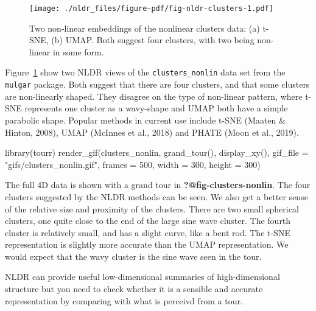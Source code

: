 \documentclass[
  letterpaper,
]{book}
\newenvironment{Shaded}{\begin{snugshade}}{\end{snugshade}}
\newcommand{\AttributeTok}[1]{\textcolor[rgb]{0.40,0.45,0.13}{#1}}
\newcommand{\DecValTok}[1]{\textcolor[rgb]{0.68,0.00,0.00}{#1}}
\newcommand{\FunctionTok}[1]{\textcolor[rgb]{0.28,0.35,0.67}{#1}}
\newcommand{\NormalTok}[1]{\textcolor[rgb]{0.00,0.23,0.31}{#1}}
\newcommand{\StringTok}[1]{\textcolor[rgb]{0.13,0.47,0.30}{#1}}
\begin{document}
\begin{figure}[H]

{\centering \texttt{[image: ./nldr\_files/figure-pdf/fig-nldr-clusters-1.pdf]}

}

\caption{\label{fig-nldr-clusters}Two non-linear embeddings of the
nonlinear clusters data: (a) t-SNE, (b) UMAP. Both suggest four
clusters, with two being non-linear in some form.}

\end{figure}

Figure~\ref{fig-nldr-clusters} show two NLDR views of the
\texttt{clusters\_nonlin} data set from the \texttt{mulgar} package.
Both suggest that there are four clusters, and that some clusters are
non-linearly shaped. They disagree on the type of non-linear pattern,
where t-SNE represents one cluster as a wavy-shape and UMAP both have a
simple parabolic shape. Popular methods in current use include t-SNE
(Maaten \& Hinton, 2008), UMAP (McInnes et al., 2018) and PHATE (Moon et
al., 2019).

\begin{Shaded}
\begin{Highlighting}[]
\FunctionTok{library}\NormalTok{(tourr)}
\FunctionTok{render\_gif}\NormalTok{(clusters\_nonlin, }
           \FunctionTok{grand\_tour}\NormalTok{(),}
           \FunctionTok{display\_xy}\NormalTok{(),}
           \AttributeTok{gif\_file =} \StringTok{"gifs/clusters\_nonlin.gif"}\NormalTok{,}
           \AttributeTok{frames =} \DecValTok{500}\NormalTok{,}
           \AttributeTok{width =} \DecValTok{300}\NormalTok{, }
           \AttributeTok{height =} \DecValTok{300}\NormalTok{)}
\end{Highlighting}
\end{Shaded}

The full 4D data is shown with a grand tour in
\textbf{?@fig-clusters-nonlin}. The four clusters suggested by the NLDR
methods can be seen. We also get a better sense of the relative size and
proximity of the clusters. There are two small spherical clusters, one
quite close to the end of the large sine wave cluster. The fourth
cluster is relatively small, and has a slight curve, like a bent rod.
The t-SNE representation is slightly more accurate than the UMAP
representation. We would expect that the wavy cluster is the sine wave
seen in the tour.

NLDR can provide useful low-dimensional summaries of high-dimensional
structure but you need to check whether it is a sensible and accurate
representation by comparing with what is perceivd from a tour.
\end{document}
